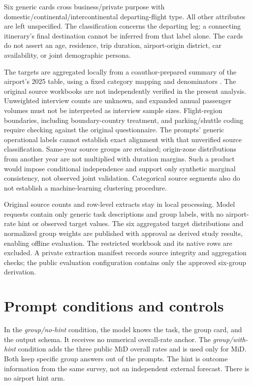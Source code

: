 \documentclass{article}
\begin{document}
Six generic cards cross business/private purpose with domestic/continental/intercontinental departing-flight type. All other attributes are left unspecified. The classification concerns the departing leg; a connecting itinerary's final destination cannot be inferred from that label alone. The cards do not assert an age, residence, trip duration, airport-origin district, car availability, or joint demographic persona.

The targets are aggregated locally from a coauthor-prepared summary of the airport's 2025 table, using a fixed category mapping and denominators \citep{fmgsummary2026}. The original source workbooks are not independently verified in the present analysis. Unweighted interview counts are unknown, and expanded annual passenger volumes must not be interpreted as interview sample sizes. Flight-region boundaries, including boundary-country treatment, and parking/shuttle coding require checking against the original questionnaire. The prompts' generic operational labels cannot establish exact alignment with that unverified source classification. Same-year source groups are retained; origin-zone distributions from another year are not multiplied with duration margins. Such a product would impose conditional independence and support only synthetic marginal consistency, not observed joint validation. Categorical source segments also do not establish a machine-learning clustering procedure.

Original source counts and row-level extracts stay in local processing. Model requests contain only generic task descriptions and group labels, with no airport-rate hint or observed target values. The six aggregated target distributions and normalized group weights are published with approval as derived study results, enabling offline evaluation. The restricted workbook and its native rows are excluded. A private extraction manifest records source integrity and aggregation checks; the public evaluation configuration contains only the approved six-group derivation.

\section{Prompt conditions and controls}
In the \emph{group/no-hint} condition, the model knows the task, the group card, and the output schema. It receives no numerical overall-rate anchor. The \emph{group/with-hint} condition adds the three public MiD overall rates and is used only for MiD. Both keep specific group answers out of the prompts. The hint is outcome information from the same survey, not an independent external forecast. There is no airport hint arm.
\end{document}
